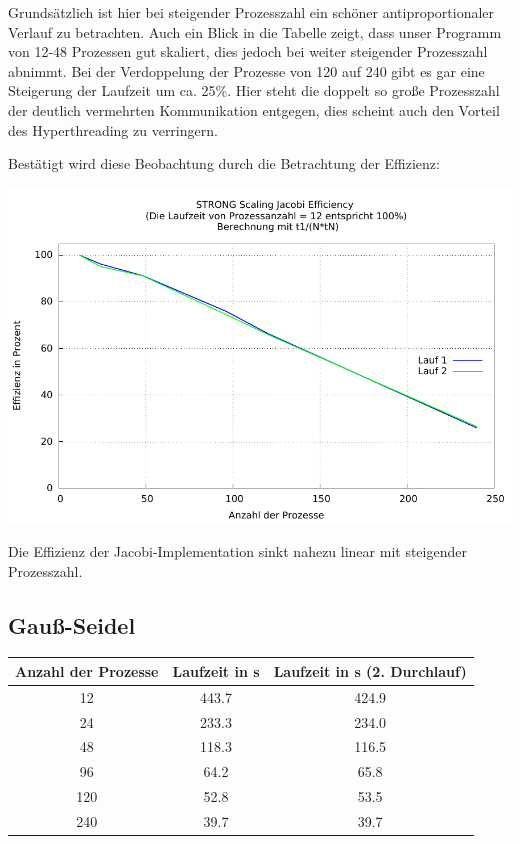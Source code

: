 \documentclass[a4paper]{article}
\begin{document}
Grundsätzlich ist hier bei steigender Prozesszahl ein schöner antiproportionaler Verlauf zu betrachten. Auch ein Blick in die Tabelle zeigt, dass unser Programm von 12-48 Prozessen gut skaliert, dies jedoch bei weiter steigender Prozesszahl abnimmt. Bei der Verdoppelung der Prozesse von 120 auf 240 gibt es gar eine Steigerung der Laufzeit um ca. 25\%. Hier steht die doppelt so große Prozesszahl der deutlich vermehrten Kommunikation entgegen, dies scheint auch den Vorteil des Hyperthreading zu verringern.

Bestätigt wird diese Beobachtung durch die Betrachtung der Effizienz:

\includegraphics[scale=0.8]{img/STRONG_SCALING_JA_efficiency.pdf}

Die Effizienz der Jacobi-Implementation sinkt nahezu linear mit steigender Prozesszahl.

\subsection{Gauß-Seidel}
\begin{tabular}{|c|c|c|}
\hline 
Anzahl der Prozesse & Laufzeit in s & Laufzeit in s (2. Durchlauf) \\ 
\hline 
12 & 443.7 & 424.9 \\ 
\hline 
24 & 233.3 & 234.0 \\ 
\hline 
48 & 118.3 & 116.5 \\ 
\hline 
96 & 64.2 & 65.8 \\ 
\hline 
120 & 52.8 & 53.5 \\ 
\hline 
240 & 39.7 & 39.7 \\ 
\hline
\end{tabular} 
\end{document}
